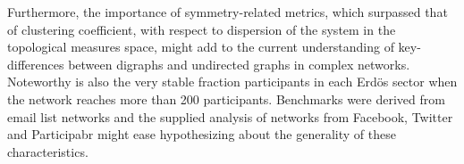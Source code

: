 \documentclass[%
	aip,
	jmp,%
	amsmath,amssymb,
	reprint,%
]{revtex4-1}
\begin{document}
																																																																																					Furthermore, the importance of symmetry-related metrics,
																																																																																					which surpassed that of clustering coefficient,
																																																																																					with respect to dispersion of the system in the topological measures space,
																																																																																					might add to the current understanding of key-differences between digraphs and
																																																																																					undirected graphs in complex networks.
																																																																																					Noteworthy is also the very stable fraction participants in each Erd\"os sector when the network reaches more than 200 participants.
																																																																																					Benchmarks were derived from email list networks
																																																																																					and the supplied analysis of
																																																																																					networks from Facebook,
																																																																																					Twitter and Participabr might ease hypothesizing
																																																																																					about the generality of these characteristics.
\end{document}
